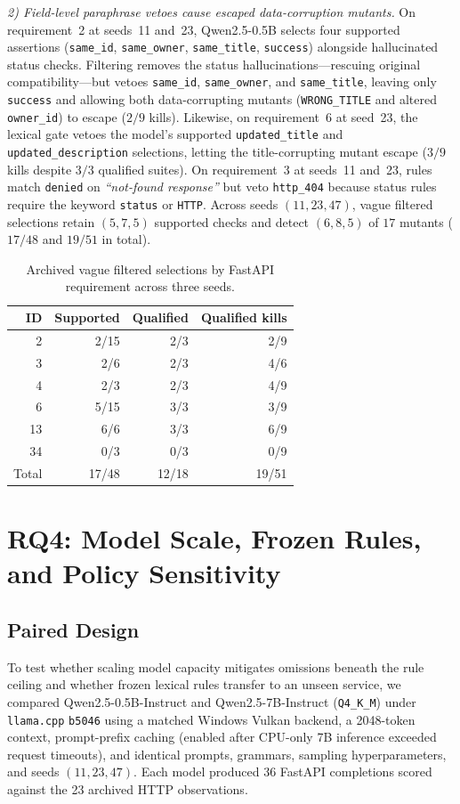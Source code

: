 \documentclass[sigconf,nonacm]{acmart}
\begin{document}
\emph{2) Field-level paraphrase vetoes cause escaped data-corruption mutants.} On requirement~2 at seeds~11 and~23, Qwen2.5-0.5B selects four supported assertions (\texttt{same\_id}, \texttt{same\_owner}, \texttt{same\_title}, \texttt{success}) alongside hallucinated status checks. Filtering removes the status hallucinations---rescuing original compatibility---but vetoes \texttt{same\_id}, \texttt{same\_owner}, and \texttt{same\_title}, leaving only \texttt{success} and allowing both data-corrupting mutants (\texttt{WRONG\_TITLE} and altered \texttt{owner\_id}) to escape ($2/9$ kills). Likewise, on requirement~6 at seed~23, the lexical gate vetoes the model's supported \texttt{updated\_title} and \texttt{updated\_description} selections, letting the title-corrupting mutant escape ($3/9$ kills despite $3/3$ qualified suites). On requirement~3 at seeds~11 and~23, rules match \texttt{denied} on \emph{``not-found response''} but veto \texttt{http\_404} because status rules require the keyword \texttt{status} or \texttt{HTTP}. Across seeds $(11,23,47)$, vague filtered selections retain $(5,7,5)$ supported checks and detect $(6,8,5)$ of $17$ mutants ($17/48$ and $19/51$ in total).

\begin{table}[t]
\caption{Archived vague filtered selections by FastAPI requirement across three seeds.}
\label{tab:byreq}
\centering\small
\begin{tabular}{rrrr}
\toprule
ID & Supported & Qualified & Qualified kills\\
\midrule
2 & 2/15 & 2/3 & 2/9\\
3 & 2/6 & 2/3 & 4/6\\
4 & 2/3 & 2/3 & 4/9\\
6 & 5/15 & 3/3 & 3/9\\
13 & 6/6 & 3/3 & 6/9\\
34 & 0/3 & 0/3 & 0/9\\
\midrule
Total & 17/48 & 12/18 & 19/51\\
\bottomrule
\end{tabular}
\end{table}

\section{RQ4: Model Scale, Frozen Rules, and Policy Sensitivity}
\label{sec:followup}

\subsection{Paired Design}
To test whether scaling model capacity mitigates omissions beneath the rule ceiling and whether frozen lexical rules transfer to an unseen service, we compared Qwen2.5-0.5B-Instruct and Qwen2.5-7B-Instruct (\texttt{Q4\_K\_M}) \cite{qwen2024,qwen7b2024} under \texttt{llama.cpp} \texttt{b5046} using a matched Windows Vulkan backend, a 2048-token context, prompt-prefix caching (enabled after CPU-only 7B inference exceeded request timeouts), and identical prompts, grammars, sampling hyperparameters, and seeds $(11,23,47)$. Each model produced 36 FastAPI completions scored against the 23 archived HTTP observations.
\end{document}
